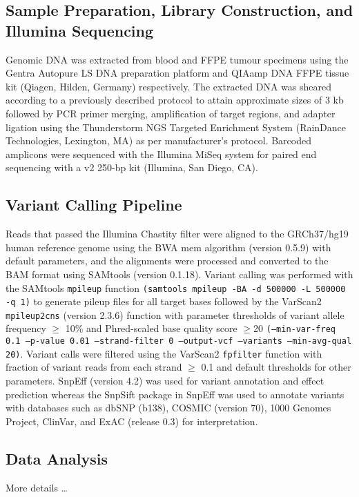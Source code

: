 \documentclass{bmcart}
\begin{document}
\subsection*{Sample Preparation, Library Construction, and Illumina Sequencing}
Genomic DNA was extracted from blood and FFPE tumour specimens using the Gentra Autopure LS DNA preparation platform and QIAamp DNA FFPE tissue kit (Qiagen, Hilden, Germany) respectively. The extracted DNA was sheared according to a previously described protocol \cite{Bosdet2013} to attain approximate sizes of 3 kb followed by PCR primer merging, amplification of target regions, and adapter ligation using the Thunderstorm NGS Targeted Enrichment System (RainDance Technologies, Lexington, MA) as per manufacturer's protocol. Barcoded amplicons were sequenced with the Illumina MiSeq system for paired end sequencing with a v2 250-bp kit (Illumina, San Diego, CA).

\subsection*{Variant Calling Pipeline}
Reads that passed the Illumina Chastity filter were aligned to the GRCh37/hg19 human reference genome using the BWA mem algorithm (version 0.5.9) with default parameters, and the alignments were processed and converted to the BAM format using SAMtools (version 0.1.18). Variant calling was performed with the SAMtools \texttt{mpileup} function \texttt{(samtools mpileup -BA -d 500000 -L 500000 -q 1)} to generate pileup files for all target bases followed by the VarScan2 \texttt{mpileup2cns} (version 2.3.6) function with parameter thresholds of variant allele frequency $\geq$ 10\% and Phred-scaled base quality score $\geq$20 \texttt{(--min-var-freq 0.1 --p-value 0.01 --strand-filter 0 --output-vcf --variants --min-avg-qual 20)}. Variant calls were filtered using the VarScan2 \texttt{fpfilter} function with fraction of variant reads from each strand $\geq$ 0.1 and default thresholds for other parameters. SnpEff (version 4.2) was used for variant annotation and effect prediction whereas the SnpSift package in SnpEff was used to annotate variants with databases such as dbSNP (b138), COSMIC (version 70), 1000 Genomes Project, ClinVar, and ExAC (release 0.3) for interpretation.

\subsection*{Data Analysis}
More details \ldots
\end{document}
